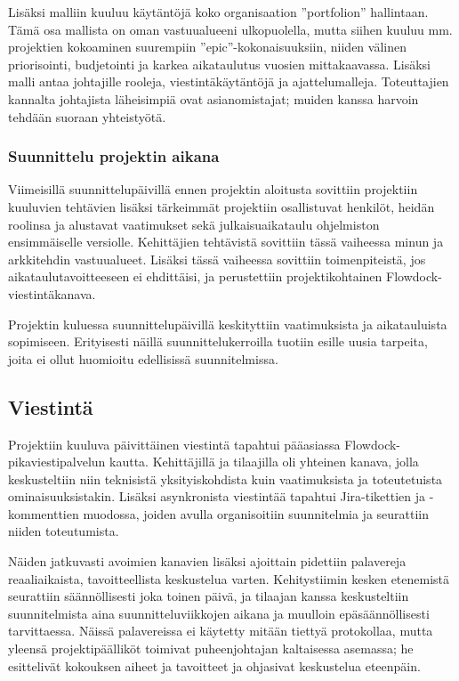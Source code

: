 \documentclass{article}
\begin{document}
Lisäksi malliin kuuluu käytäntöjä koko organisaation ''portfolion'' hallintaan.
Tämä osa mallista on oman vastuualueeni ulkopuolella, mutta siihen kuuluu mm.
projektien kokoaminen suurempiin ''epic''-kokonaisuuksiin, niiden välinen
priorisointi, budjetointi ja karkea aikataulutus vuosien mittakaavassa. Lisäksi
malli antaa johtajille rooleja, vies\-tintäkäytäntöjä ja ajattelumalleja.
Toteuttajien kannalta johtajista läheisimpiä ovat asianomistajat; muiden kanssa
harvoin tehdään suoraan yhteistyötä.

\subsubsection{Suunnittelu projektin aikana}

Viimeisillä suunnittelupäivillä ennen projektin aloitusta sovittiin projektiin
kuuluvien tehtävien lisäk\-si tärkeimmät projektiin osallistuvat henkilöt,
heidän roolinsa ja alustavat vaatimukset sekä julkaisu\-aikataulu ohjelmiston
ensimmäiselle versiolle. Kehittäjien tehtävistä sovittiin tässä vaiheessa minun
ja arkkitehdin vastuualueet. Lisäksi tässä vaiheessa sovittiin toimenpiteistä,
jos aikataulutavoitteeseen ei ehdittäisi, ja perustettiin projektikohtainen
Flowdock-viestintäkanava.

Projektin kuluessa suunnittelupäivillä keskityttiin vaatimuksista ja
aikatauluista sopimiseen. Erityisesti näillä suunnittelukerroilla tuotiin
esille uusia tarpeita, joita ei ollut huomioitu edellisissä suunnitelmissa.

\subsection{Viestintä}

Projektiin kuuluva päivittäinen viestintä tapahtui pääasiassa
Flowdock-pikaviestipalvelun kautta. Kehittäjillä ja tilaajilla oli yhteinen
kanava, jolla keskusteltiin niin teknisistä yksityiskohdista kuin vaatimuksista
ja toteutetuista ominaisuuksistakin. Lisäksi asynkronista viestintää tapahtui
Jira-tikettien ja -kommenttien muodossa, joiden avulla organisoitiin
suunnitelmia ja seurattiin niiden toteutumista.

Näiden jatkuvasti avoimien kanavien lisäksi ajoittain pidettiin palavereja
reaaliaikaista, tavoitteellista keskustelua varten. Kehitystiimin kesken
etenemistä seurattiin säännöllisesti joka toinen päivä, ja tilaajan kanssa
keskusteltiin suunnitelmista aina suunnitteluviikkojen aikana ja muulloin
epäsäännöllisesti tarvittaessa. Näissä palavereissa ei käytetty mitään tiettyä
protokollaa, mutta yleensä projektipäälliköt toimivat puheenjohtajan
kaltaisessa asemassa; he esittelivät kokouksen aiheet ja tavoitteet ja
ohjasivat keskustelua eteenpäin.
\end{document}
